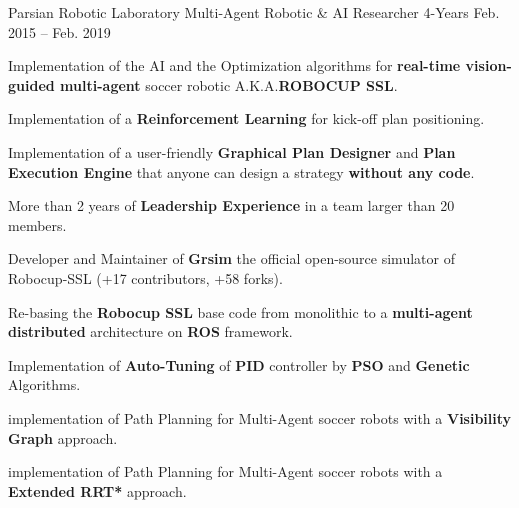 

\begin{cventries}


  \cventry
    {Parsian Robotic Laboratory} %
    {Multi-Agent Robotic \& AI Researcher} %
    {4-Years} %
    {Feb. 2015 -- Feb. 2019} %
    {
      \begin{cvitems} %
        \item Implementation of the AI and the Optimization algorithms for \textbf{real-time vision-guided multi-agent} soccer robotic A.K.A.\textbf{ROBOCUP SSL}.
        \item Implementation of a \textbf{Reinforcement Learning} for kick-off plan positioning.
        \item Implementation of a user-friendly \textbf{Graphical Plan Designer} and \textbf{Plan Execution Engine} that anyone can design a strategy \textbf{without any code}.
        \item More than 2 years of \textbf{Leadership Experience} in a team larger than 20 members.
        \item Developer and Maintainer of \textbf{Grsim} the official open-source simulator of Robocup-SSL (+17 contributors, +58 forks).
        \item Re-basing the \textbf{Robocup SSL} base code from monolithic  to a \textbf{multi-agent distributed} architecture on \textbf{ROS} framework.
        \item Implementation of \textbf{Auto-Tuning} of \textbf{PID} controller by \textbf{PSO} and \textbf{Genetic} Algorithms.
        \item implementation of Path Planning for Multi-Agent soccer robots with a \textbf{Visibility Graph} approach.
        \item implementation of Path Planning for Multi-Agent soccer robots with a \textbf{Extended RRT*} approach.
      \end{cvitems}
    }




\end{cventries}
